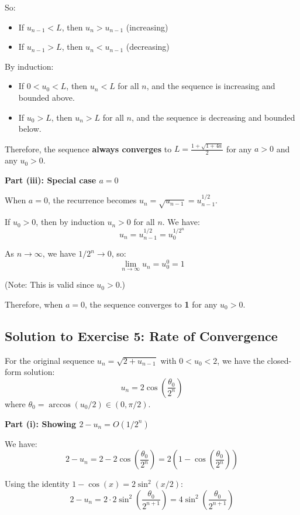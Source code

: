 \documentclass[12pt,a4paper]{article}
\theoremstyle{definition}
\begin{document}
So:
\begin{itemize}
    \item If $u_{n-1} < L$, then $u_n > u_{n-1}$ (increasing)
    \item If $u_{n-1} > L$, then $u_n < u_{n-1}$ (decreasing)
\end{itemize}

By induction:
\begin{itemize}
    \item If $0 < u_0 < L$, then $u_n < L$ for all $n$, and the sequence is increasing and bounded above.
    \item If $u_0 > L$, then $u_n > L$ for all $n$, and the sequence is decreasing and bounded below.
\end{itemize}

Therefore, the sequence \textbf{always converges} to $L = \frac{1 + \sqrt{1 + 4a}}{2}$ for any $a > 0$ and any $u_0 > 0$.

\textbf{Part (iii): Special case $a = 0$}

When $a = 0$, the recurrence becomes $u_n = \sqrt{u_{n-1}} = u_{n-1}^{1/2}$.

If $u_0 > 0$, then by induction $u_n > 0$ for all $n$. We have:
\[
u_n = u_{n-1}^{1/2} = u_0^{1/2^n}
\]

As $n \to \infty$, we have $1/2^n \to 0$, so:
\[
\lim_{n \to \infty} u_n = u_0^0 = 1
\]

(Note: This is valid since $u_0 > 0$.)

Therefore, when $a = 0$, the sequence converges to \textbf{1} for any $u_0 > 0$.

\subsection{Solution to Exercise 5: Rate of Convergence}

For the original sequence $u_n = \sqrt{2 + u_{n-1}}$ with $0 < u_0 < 2$, we have the closed-form solution:
\[
u_n = 2\cos\left(\frac{\theta_0}{2^n}\right)
\]
where $\theta_0 = \arccos(u_0/2) \in (0, \pi/2)$.

\textbf{Part (i): Showing $2 - u_n = O(1/2^n)$}

We have:
\[
2 - u_n = 2 - 2\cos\left(\frac{\theta_0}{2^n}\right) = 2\left(1 - \cos\left(\frac{\theta_0}{2^n}\right)\right)
\]

Using the identity $1 - \cos(x) = 2\sin^2(x/2)$:
\[
2 - u_n = 2 \cdot 2\sin^2\left(\frac{\theta_0}{2^{n+1}}\right) = 4\sin^2\left(\frac{\theta_0}{2^{n+1}}\right)
\]
\end{document}
